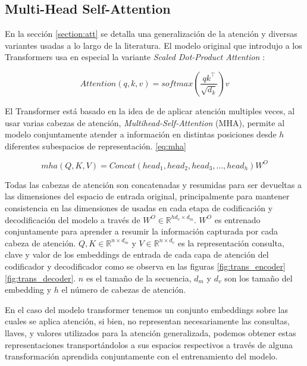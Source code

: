 \subsection{Multi-Head Self-Attention} \label{section-mha}

En la sección \ref{section:att} se detalla una generalización de la atención y diversas variantes
usadas a lo largo de la literatura. El modelo original que introdujo a los Transformers usa en
especial la variante \textit{Scaled Dot-Product Attention} \cite{Vaswani}:


\begin{equation}
    Attention(q, k, v) = softmax(\frac{q k^\top}{\sqrt{d_k}}) v
    \label{eq:trans_att_gen}
\end{equation}

El Transformer está basado en la idea de de aplicar atención multiples veces, al usar varias cabezas
de atención, \textit{Multihead-Self-Attention} (MHA), permite  al modelo conjuntamente atender a información
en distintas posiciones desde $h$ diferentes subespacios de representación. \ref{eq:mha}

\begin{equation}
    mha(Q, K, V) = Concat(head_1,head_2,head_3,..., head_h)W^O
    \label{eq:mha}
\end{equation}

Todas las cabezas de atención son concatenadas y resumidas para ser devueltas a las dimensiones del
espacio de entrada original, principalmente para mantener consistencia en las dimensiones de usadas
en cada etapa de codificación y decodificación del modelo a través de $W^O \in \mathbb{R}^{hd_v \times d_m}$.
$W^O$ es entrenado conjuntamente para aprender a resumir la información capturada por cada cabeza de
atención. $Q, K \in \mathbb{R}^{n \times d_{m}}$ y $V \in \mathbb{R}^{n \times d_{v}}$ es la representación
consulta, clave y valor de los embeddings de entrada de cada capa de atención del codificador y
decodificador como se observa en las figuras \ref{fig:trans_encoder} \ref{fig:trans_decoder}.
$n$ es el tamaño de la secuencia, $d_m$ y $d_v$ son los tamaño del embedding y $h$ el número de
cabezas de atención.

En el caso del modelo transformer tenemos un conjunto embeddings sobre las cuales se aplica atención,
si bien, no representan necesariamente las consultas, llaves, y valores utilizados para la atención
generalizada, podemos obtener estas representaciones transportándolos a sus espacios respectivos a través de alguna
transformación aprendida conjuntamente con el entrenamiento del modelo.

